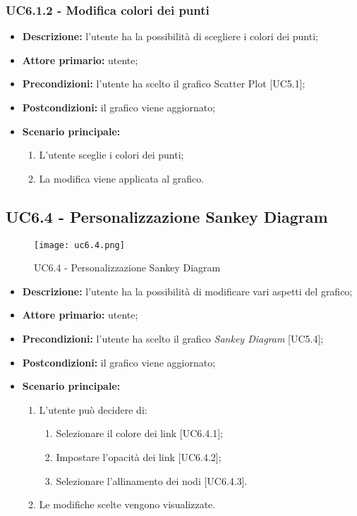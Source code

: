   \subsubsection{UC6.1.2 - Modifica colori dei punti}
  \begin{itemize}
    \item \textbf{Descrizione:} l'utente ha la possibilità di scegliere i colori dei punti;
    \item \textbf{Attore primario:} utente;
    \item \textbf{Precondizioni:} l’utente ha scelto il grafico Scatter Plot [UC5.1];
    \item \textbf{Postcondizioni:} il grafico viene aggiornato;
    \item \textbf{Scenario principale:}
      \begin{enumerate}
      \item L'utente sceglie i colori dei punti;
      \item La modifica viene applicata al grafico.
    \end{enumerate}
  \end{itemize}

\subsection{UC6.4 - Personalizzazione Sankey Diagram}
\begin{figure}[H]
  \centering
  \texttt{[image: uc6.4.png]}
  \caption{UC6.4 - Personalizzazione Sankey Diagram}
\end{figure}
\begin{itemize}
    \item \textbf{Descrizione:} l'utente ha la possibilità di modificare vari aspetti del grafico;
    \item \textbf{Attore primario:} utente;
    \item \textbf{Precondizioni:} l’utente ha scelto il grafico \textit{Sankey Diagram} [UC5.4];
    \item \textbf{Postcondizioni:} il grafico viene aggiornato;
    \item \textbf{Scenario principale:}
    \begin{enumerate}
      \item L'utente può decidere di:
    \begin{enumerate}
      \item Selezionare il colore dei link [UC6.4.1];
      \item Impostare l'opacità dei link [UC6.4.2];
      \item Selezionare l'allinamento dei nodi [UC6.4.3].
    \end{enumerate}
    \item Le modifiche scelte vengono visualizzate.
  \end{enumerate}
  \end{itemize}

